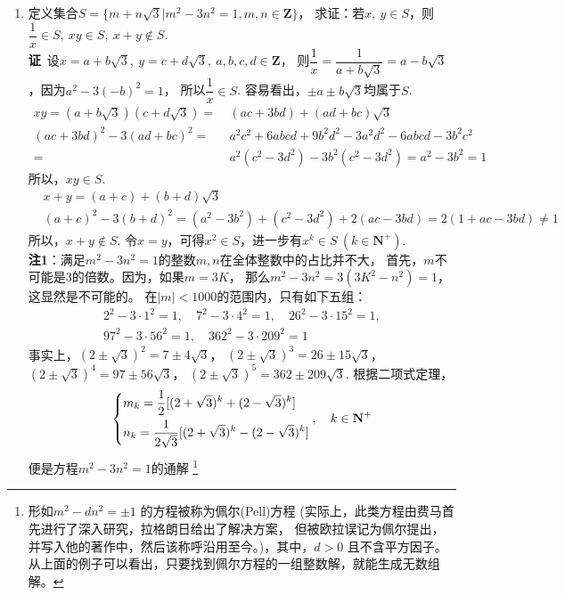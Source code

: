 \begin{enumerate}[label={【\textbf{例\thechapter.\arabic*}】},
 leftmargin=\inteval{\myenumleftmargin}pt,
 itemsep=\inteval{\myenumitempsep}pt,
 itemindent=\inteval{\myenumitemindent}pt]
\item\label{m+nsqrt3} 定义集合$ S=\{m+n\sqrt{3}|m^2-3n^2=1,m,n\in \textbf{Z}\} $，
求证：若$ x,\ y\in S $，则$ \dfrac{1}{x}\in S,\ xy \in　S,\ x+y\notin S $. \\
\textbf{证}\ 设$ x=a+b\sqrt{3},\ y=c+d\sqrt{3},\ a,b,c,d\in \textbf{Z} $，
则$ \dfrac{1}{x}=\dfrac{1}{a+b\sqrt{3}}=a-b\sqrt{3} $，因为$ a^2-3(-b)^2=1 $，
所以$ \dfrac{1}{x}\in S $. 容易看出，$ \pm a \pm b\sqrt{3} $均属于$ S $. 
\begin{align*}
    xy=(a+b\sqrt{3})(c+d\sqrt{3})=&\  (ac+3bd)+(ad+bc)\sqrt{3} \\
    (ac+3bd)^2-3(ad+bc)^2 =&\  a^2c^2+6abcd+9b^2d^2-3a^2d^2-6abcd-3b^2c^2 \\
    =&\  a^2(c^2-3d^2)-3b^2(c^2-3d^2)=a^2-3b^2=1 
\end{align*}
所以，$ xy\in S $.
\begin{align*}
    & x+y=(a+c)+(b+d)\sqrt{3} \\
    & (a+c)^2-3(b+d)^2=(a^2-3b^2)+(c^2-3d^2)+2(ac-3bd)=2(1+ac-3bd)\neq 1
\end{align*}
所以，$ x+y\notin S $. 令$ x=y $，可得$ x^2\in S $，进一步有$ x^k\in S\ 
(k\in \textbf{N}^+) $. \\
\textbf{注1}：满足$ m^2-3n^2=1 $的整数$ m,n $在全体整数中的占比并不大，
首先，$ m $不可能是3的倍数。因为，如果$ m=3K $，
那么$ m^2-3n^2=3(3K^2-n^2)=1 $，这显然是不可能的。
在$ |m|<1000 $的范围内，只有如下五组：
\begin{gather*}
   2^2-3\cdot 1^2=1,\quad 7^2-3\cdot 4^2=1,\quad 26^2-3\cdot 15^2=1,\\
    97^2-3\cdot 56^2=1,\quad 362^2-3\cdot 209^2=1
\end{gather*}
事实上，$ (2\pm\sqrt{3})^2=7\pm 4\sqrt{3} $，
$ (2\pm\sqrt{3})^3=26\pm 15\sqrt{3} $，
$ (2\pm\sqrt{3})^4=97\pm 56\sqrt{3} $，
$ (2\pm \sqrt{3})^5=362\pm 209\sqrt{3} $. 
根据二项式定理，
\begin{gather*}
    \begin{dcases}
        m_k =\dfrac{1}{2}[(2+\sqrt{3})^k+(2-\sqrt{3})^k] \\ 
        n_k =\dfrac{1}{2\sqrt{3}}[(2+\sqrt{3})^k-(2-\sqrt{3})^k]    
    \end{dcases} , \quad  k\in \textbf{N}^+
\end{gather*}
便是方程$ m^2-3n^2=1 $的通解
\footnote{形如$ m^2-dn^2=\pm 1 $ 的方程被称为佩尔(Pell)方程
(实际上，此类方程由费马首先进行了深入研究，拉格朗日给出了解决方案，
但被欧拉误记为佩尔提出，并写入他的著作中，然后该称呼沿用至今。)，其中，$ d>0 $
且不含平方因子。从上面的例子可以看出，只要找到佩尔方程的一组整数解，就能生成无数组解。
}
\end{enumerate}
